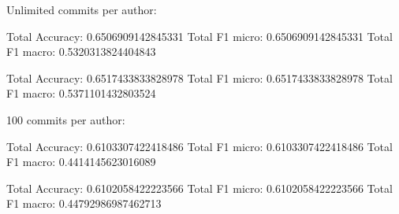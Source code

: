 Unlimited commits per author:

Total Accuracy: 0.6506909142845331
Total F1 micro: 0.6506909142845331
Total F1 macro: 0.5320313824404843

Total Accuracy: 0.6517433833828978
Total F1 micro: 0.6517433833828978
Total F1 macro: 0.5371101432803524

100 commits per author:

Total Accuracy: 0.6103307422418486
Total F1 micro: 0.6103307422418486
Total F1 macro: 0.4414145623016089

Total Accuracy: 0.6102058422223566
Total F1 micro: 0.6102058422223566
Total F1 macro: 0.44792986987462713
